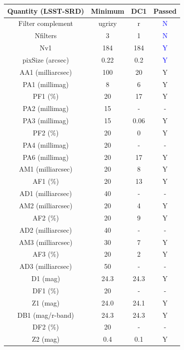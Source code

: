 \documentclass[twocolumn]{aastex62}
\begin{document}
\begin{table}[h!]
\centering
\begin{tabular}{|c|c|c|c|}
\hline
Quantity (LSST-SRD) & Minimum & DC1 & Passed\\
\hline
Filter complement & ugrizy & r & \textcolor{blue}{N}\\
Nfilters & 3 & 1 & \textcolor{blue}{N}\\
Nv1 & 184 & 184 & \textcolor{blue}{Y}\\
pixSize (arcsec) & 0.22 & 0.2 & \textcolor{blue}{Y}\\
AA1 (milliarcsec) & 100 & 20 & Y\\
PA1 (millimag) & 8 & 6 & Y\\
PF1 (\%) & 20 & 17 & Y\\
PA2 (millimag) & 15 & - & -\\
PA3 (millimag) & 15 & 0.06  & Y\\
PF2 (\%) & 20 & 0 & Y\\
PA4 (millimag) & 20 & - & -\\
PA6 (millimag) & 20 & 17 & Y\\
AM1 (milliarcsec) & 20 & 8 & Y\\
AF1 (\%) & 20 & 13 & Y\\
AD1 (milliarcsec) & 40 & - & -\\
AM2 (milliarcsec) & 20 & 4 & Y\\
AF2 (\%) & 20 & 9 & Y\\
AD2 (milliarcsec) & 40 & - & -\\
AM3 (milliarcsec) & 30 & 7 & Y\\
AF3 (\%) & 20 & 2 & Y\\
AD3 (milliarcsec) & 50 & - & -\\
D1 (mag) & 24.3 & 24.3 & Y\\
DF1 (\%) & 20 & - & -\\
Z1 (mag) & 24.0 & 24.1 & Y\\
DB1 (mag/r-band) & 24.3 & 24.3 & Y\\
DF2 (\%) & 20 & - & -\\
Z2 (mag) & 0.4 & 0.1 & Y\\

\end{tabular}
\end{table}
\end{document}
